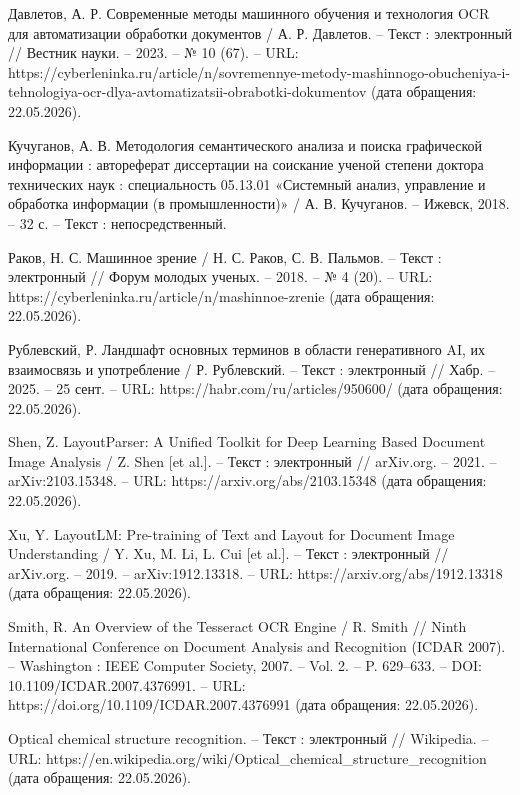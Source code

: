 Давлетов, А. Р. Современные методы машинного обучения и технология OCR для автоматизации обработки документов / А. Р. Давлетов. – Текст : электронный // Вестник науки. – 2023. – № 10 (67). – URL: https://cyberleninka.ru/article/n/sovremennye-metody-mashinnogo-obucheniya-i-tehnologiya-ocr-dlya-avtomatizatsii-obrabotki-dokumentov (дата обращения: 22.05.2026).

Кучуганов, А. В. Методология семантического анализа и поиска графической информации : автореферат диссертации на соискание ученой степени доктора технических наук : специальность 05.13.01 «Системный анализ, управление и обработка информации (в промышленности)» / А. В. Кучуганов. – Ижевск, 2018. – 32 с. – Текст : непосредственный.

Раков, Н. С. Машинное зрение / Н. С. Раков, С. В. Пальмов. – Текст : электронный // Форум молодых ученых. – 2018. – № 4 (20). – URL: https://cyberleninka.ru/article/n/mashinnoe-zrenie (дата обращения: 22.05.2026).

Рублевский, Р. Ландшафт основных терминов в области генеративного AI, их взаимосвязь и употребление / Р. Рублевский. – Текст : электронный // Хабр. – 2025. – 25 сент. – URL: https://habr.com/ru/articles/950600/ (дата обращения: 22.05.2026).

Shen, Z. LayoutParser: A Unified Toolkit for Deep Learning Based Document Image Analysis / Z. Shen [et al.]. – Текст : электронный // arXiv.org. – 2021. – arXiv:2103.15348. – URL: https://arxiv.org/abs/2103.15348 (дата обращения: 22.05.2026).

Xu, Y. LayoutLM: Pre-training of Text and Layout for Document Image Understanding / Y. Xu, M. Li, L. Cui [et al.]. – Текст : электронный // arXiv.org. – 2019. – arXiv:1912.13318. – URL: https://arxiv.org/abs/1912.13318 (дата обращения: 22.05.2026).

Smith, R. An Overview of the Tesseract OCR Engine / R. Smith // Ninth International Conference on Document Analysis and Recognition (ICDAR 2007). – Washington : IEEE Computer Society, 2007. – Vol. 2. – P. 629–633. – DOI: 10.1109/ICDAR.2007.4376991. – URL: https://doi.org/10.1109/ICDAR.2007.4376991 (дата обращения: 22.05.2026).

Optical chemical structure recognition. – Текст : электронный // Wikipedia. – URL: https://en.wikipedia.org/wiki/Optical\_chemical\_structure\_recognition (дата обращения: 22.05.2026).

